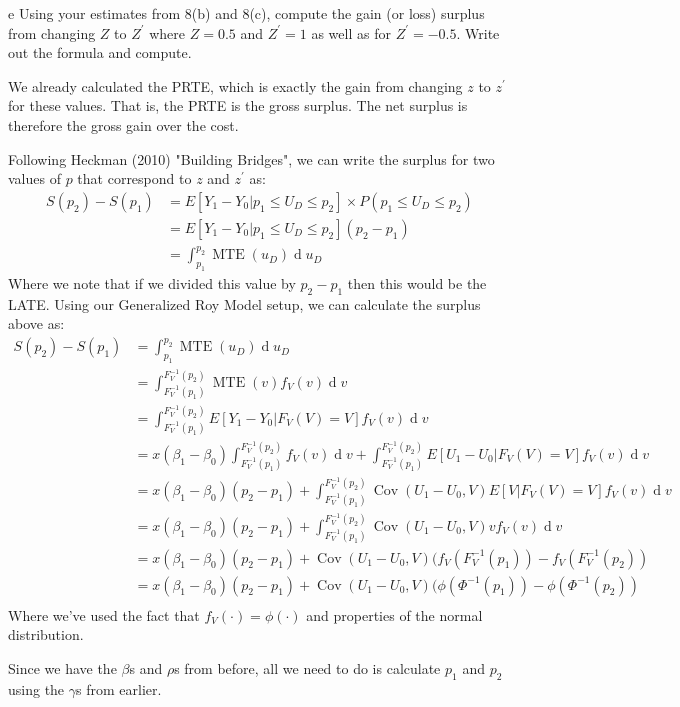 \documentclass{article}
\begin{document}
\begin{problem}{e}
Using your estimates from 8(b) and 8(c), compute the gain (or loss) surplus from changing $Z$ to $Z^{\prime}$ where $Z=0.5$ and $Z^{\prime}=1$ as well as for $Z^{\prime}=-0.5$. Write out the formula and compute.
\end{problem}
\begin{solution}
We already calculated the PRTE, which is exactly the gain from changing $z$ to $z^\prime$ for these values. That is, the PRTE is the gross surplus. The net surplus is therefore the gross gain over the cost.

Following Heckman (2010) "Building Bridges", we can write the surplus for two values of $p$ that correspond to $z$ and $z^\prime$ as:
\begin{align*}
    S(p_2) - S(p_1) &= E[Y_1-Y_0| p_1 \leq U_D \leq p_2] \times P(p_1 \leq U_D \leq p_2) \\
    &= E[Y_1-Y_0| p_1 \leq U_D \leq p_2] (p_2-p_1) \\
    &= \int_{p_1}^{p_2} \operatorname{MTE}(u_D) \operatorname{d} u_D
\end{align*}
Where we note that if we divided this value by $p_2-p_1$ then this would be the LATE. Using our Generalized Roy Model setup, we can calculate the surplus above as:
\begin{align*}
    S(p_2) - S(p_1) &= \int_{p_1}^{p_2} \operatorname{MTE}(u_D) \operatorname{d} u_D \\
    &= \int_{F_V^{-1}(p_1)}^{F_V^{-1}(p_2)} \operatorname{MTE}(v) f_V(v) \operatorname{d} v \\
    &= \int_{F_V^{-1}(p_1)}^{F_V^{-1}(p_2)} E[Y_1-Y_0 | F_V(V)=V] f_V(v) \operatorname{d} v \\
    &= x(\beta_1-\beta_0) \int_{F_V^{-1}(p_1)}^{F_V^{-1}(p_2)}f_V(v)\operatorname{d} v  + 
    \int_{F_V^{-1}(p_1)}^{F_V^{-1}(p_2)} E[U_1 - U_0 | F_V(V)=V] f_V(v) \operatorname{d} v \\
    &= x(\beta_1-\beta_0) (p_2-p_1)  + 
    \int_{F_V^{-1}(p_1)}^{F_V^{-1}(p_2)}\operatorname{Cov}(U_1 - U_0,V) E[V | F_V(V)=V] f_V(v) \operatorname{d} v \\
    &= x(\beta_1-\beta_0) (p_2-p_1)  + 
    \int_{F_V^{-1}(p_1)}^{F_V^{-1}(p_2)}\operatorname{Cov}(U_1 - U_0,V) v f_V(v) \operatorname{d} v \\
    &= x(\beta_1-\beta_0) (p_2-p_1) + \operatorname{Cov}(U_1 - U_0,V) (f_V(F_V^{-1}(p_1)) - f_V(F_V^{-1}(p_2))  \\
    &= x(\beta_1-\beta_0) (p_2-p_1) + \operatorname{Cov}(U_1 - U_0,V) (\phi(\Phi^{-1}(p_1)) - \phi(\Phi^{-1}(p_2))  \\
\end{align*}
Where we've used the fact that $f_V(\cdot)=\phi(\cdot)$ and properties of the normal distribution.

Since we have the $\beta$s and $\rho$s from before, all we need to do is calculate $p_1$ and $p_2$ using the $\gamma$s from earlier. 

\end{solution}
\end{document}
